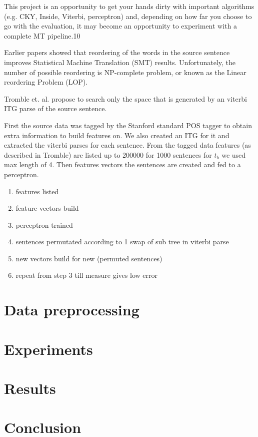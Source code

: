 \documentclass[11pt,DIV=11]{scrartcl}
\begin{document}
This project is an opportunity to get your hands dirty with important algorithms (e.g. CKY, Inside, Viterbi, perceptron) and, depending on how far you choose to go with the evaluation, it may become an opportunity to experiment with a complete MT pipeline.10


Earlier papers showed that reordering of the words in the source sentence improves Statistical Machine Translation (SMT) results. 
Unfortunately, the number of possible reordering is NP-complete problem, or known as the Linear reordering Problem (LOP).

Tromble et. al. \cite{Tromble2009} propose to search only the space that is generated by an viterbi ITG parse of the source sentence.

First the source data was tagged by the Stanford standard POS tagger to obtain extra information to build features on.
We also created an ITG for it and extracted the viterbi parses for each sentence.
From the tagged data features (as described in Tromble) are listed up to 200000 for 1000 sentences for $t_b$ we used max length of 4.
Then features vectors the sentences are created and fed to a perceptron.

\begin{enumerate}
  \item features listed
  \item feature vectors build
  \item perceptron trained
  \item sentences permutated according to 1 swap of sub tree in viterbi parse
  \item new vectors build for new (permuted sentences)
  \item repeat from step 3 till measure gives low error
\end {enumerate}

\section{Data preprocessing}
\label{data_preprocess}

\section{Experiments}
\label{experiments}

\section{Results}
\label{results}

\section{Conclusion}
\label{conclusion}


\pagebreak

{\small
	
}
\end{document}
